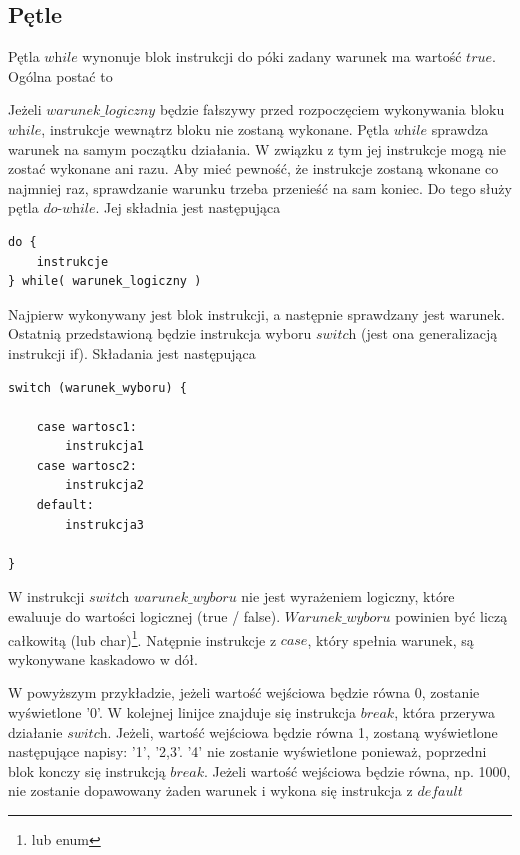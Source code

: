\documentclass[11pt]{article}
\begin{document}
\subsection{Pętle}
Pętla $\textit{while}$ wynonuje blok instrukcji do póki zadany warunek ma wartość $\textit{true}$. Ogólna postać to
 
Jeżeli $\textit{warunek\_logiczny}$ będzie fałszywy przed rozpoczęciem wykonywania bloku $\textit{while}$, instrukcje wewnątrz bloku nie zostaną wykonane. Pętla $\textit{while}$ sprawdza warunek na samym początku działania. W związku z tym jej instrukcje mogą nie zostać wykonane ani razu. Aby mieć pewność, że instrukcje zostaną wkonane co najmniej raz, sprawdzanie warunku trzeba przenieść na sam koniec. Do tego służy pętla $\textit{do-while}$. Jej składnia jest następująca
\begin{lstlisting}
do { 
	instrukcje
} while( warunek_logiczny )
\end{lstlisting}
Najpierw wykonywany jest blok instrukcji, a następnie sprawdzany jest warunek.\\
Ostatnią przedstawioną będzie instrukcja wyboru $\textit{switch}$ (jest ona generalizacją instrukcji if). Składania jest następująca
\begin{lstlisting}
switch (warunek_wyboru) {

	case wartosc1:
		instrukcja1
	case wartosc2:
		instrukcja2
	default:
		instrukcja3

}
\end{lstlisting}
W instrukcji $\textit{switch}$ $\textit{warunek\_wyboru}$ nie jest wyrażeniem logiczny, które ewaluuje do wartości logicznej (true / false). $\textit{Warunek\_wyboru}$ powinien być liczą całkowitą (lub char)\footnote{lub enum}. Natępnie instrukcje z $\textit{case}$, który spełnia warunek, są wykonywane kaskadowo w dół.

W powyższym przykładzie, jeżeli wartość wejściowa będzie równa 0, zostanie wyświetlone '0'. W kolejnej linijce znajduje się instrukcja $\textit{break}$, która przerywa działanie $\textit{switch}$.
Jeżeli, wartość wejściowa będzie równa 1, zostaną wyświetlone następujące napisy: '1', '2,3'. '4' nie zostanie wyświetlone ponieważ, poprzedni blok konczy się instrukcją $break$. Jeżeli wartość wejściowa będzie równa, np. 1000, nie zostanie dopawowany żaden warunek i wykona się instrukcja z $\textit{default}$
\end{document}
